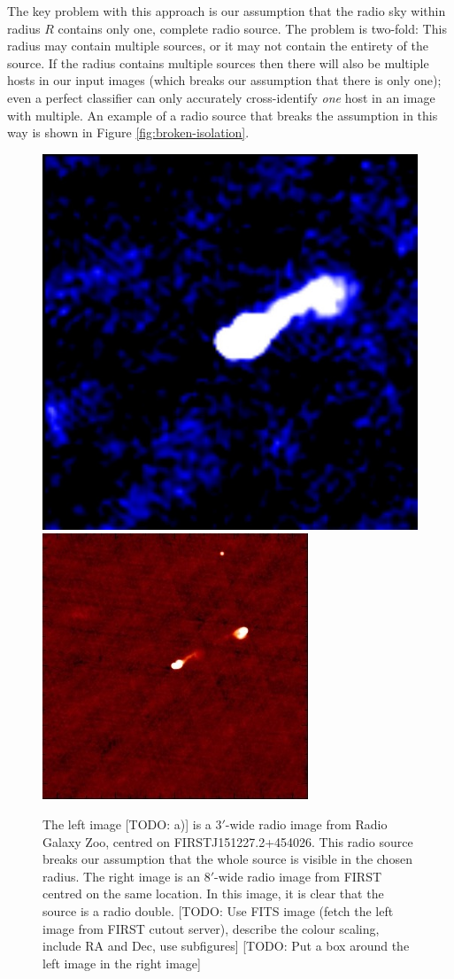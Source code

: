 \documentclass[fleqn,usenatbib,usedcolumn]{mnras}
\begin{document}
    The key problem with this approach is our assumption that the radio sky
    within radius $R$ contains only one, complete radio source. The problem is
    two-fold: This radius may contain multiple sources, or it may not contain
    the entirety of the source. If the radius contains multiple sources then
    there will also be multiple hosts in our input images (which breaks our
    assumption that there is only one); even a perfect classifier can only
    accurately cross-identify \emph{one} host in an image with multiple. An
    example of a radio source that breaks the assumption in this way is shown
    in Figure \ref{fig:broken-isolation}.

    \begin{figure}
      \centering
      \includegraphics[width=0.45\linewidth]{images/ARG0000u0h_radio.jpg}
      \includegraphics[width=0.45\linewidth]{images/ARG0000u0h_first.jpg}
      \caption{The left image [TODO: a)] is a $3'$-wide radio image from Radio Galaxy
        Zoo, centred on FIRSTJ151227.2+454026. This radio source
        breaks our assumption that the whole source is visible in the chosen
        radius. The right image is an $8'$-wide radio image from FIRST centred
        on the same location. In this image, it is clear that the source is a
        radio double. [TODO: Use FITS image (fetch the left image from FIRST
        cutout server), describe the colour scaling, include RA and Dec, use
        subfigures] [TODO: Put a box around the left image in the right image]}
      \label{fig:broken-contains}
    \end{figure}
\end{document}
